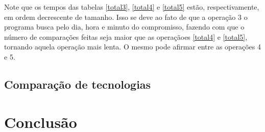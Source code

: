 \documentclass[10pt,a4paper]{article}
\begin{document}
  
  Note que os tempos das tabelas \ref{total3}, \ref{total4} e \ref{total5} estão, respectivamente, em ordem decrescente de tamanho. Isso se deve ao fato de que a operação 3 o programa busca pelo dia, hora e minuto do compromisso, fazendo com que o número de comparações feitas seja maior que as operaçãoes \ref{total4} e \ref{total5}, tornando aquela operação mais lenta. O mesmo pode afirmar entre as operações 4 e 5.

\subsection{Comparação de tecnologias}


\section{Conclusão}


\begin{small}
  
\end{small}
\end{document}
